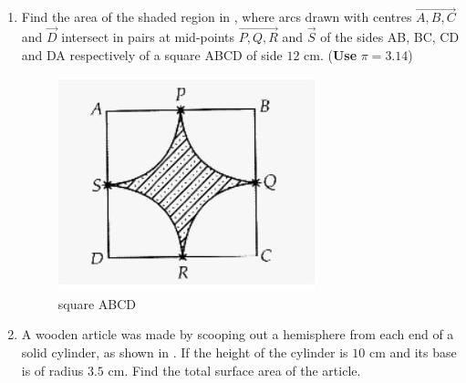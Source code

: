 \begin{enumerate}
\item Find the area of the shaded region in , where arcs drawn with centres $\vec{A,B,C}$ and $\vec{D}$ intersect in pairs at mid-points $\vec{P, Q, R}$ and $\vec{S}$ of the sides AB, BC, CD and DA respectively of a square ABCD of side $12$ cm. ({\textbf{Use}}  $\pi  = 3.14  $)
	\begin{figure}[H]
		\centering
		\includegraphics[width=\columnwidth]{figs/squareq20.jpg}
		\caption{square ABCD}
		\label{fig:Fig2}
	\end{figure}
\item A wooden article was made by scooping out a hemisphere from each end of a solid cylinder, as shown in . If the height of the cylinder is $10$ cm and its base is of radius $3.5$ cm. Find the total surface area of the article.
	

\end{enumerate}
